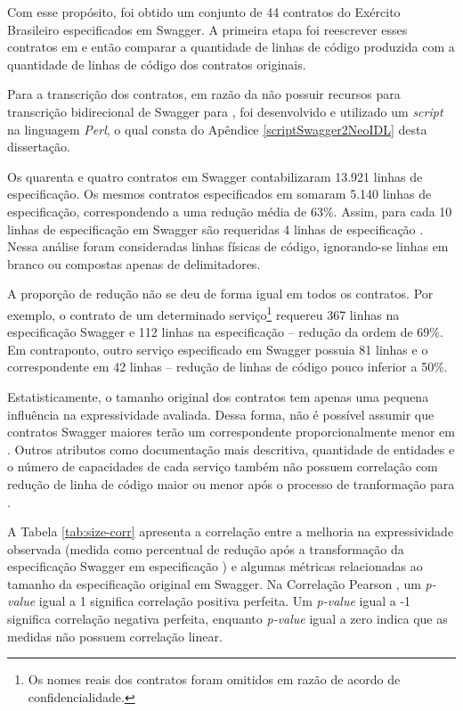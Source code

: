 Com esse propósito, foi obtido um conjunto de 44 contratos do Exército
Brasileiro especificados em Swagger. A primeira etapa foi reescrever esses
contratos em \neoidl{} e então comparar a quantidade de linhas de código
produzida com a quantidade de linhas de código dos contratos originais.

Para a
transcrição dos contratos, em razão da \neoidl{} não possuir recursos para
trans\-crição bidirecional de Swagger para \neoidl{}, foi desenvolvido
e utilizado um \textit{script} na linguagem \textit{Perl}, 
o qual consta do Apêndice \ref{scriptSwagger2NeoIDL} desta dissertação.

Os quarenta e quatro contratos em Swagger contabilizaram 13.921 linhas de
especificação. Os mesmos contratos especificados em \neoidl{} somaram 5.140
linhas de especificação, correspondendo a uma redução média de 63\%. Assim, para
cada 10 linhas de especificação em Swagger são requeridas 4 linhas de
especificação \neoidl{}. Nessa análise foram consideradas linhas físicas de
código, ignorando-se linhas em branco ou compostas apenas de delimitadores.

A proporção de redução não se deu de forma igual em todos os contratos. Por
exemplo, o contrato de um determinado serviço\footnote{Os nomes reais dos
contratos foram omitidos em razão de acordo de confidencialidade.} requereu 367
linhas na especificação Swagger e 112 linhas na especificação \neoidl{} --
redução da ordem de 69\%.
Em contraponto, outro serviço especificado em Swagger possuia 81 linhas e o
correspondente em \neoidl{} 42 linhas -- redução de linhas de código pouco inferior a 50\%.

Estatisticamente, o tamanho original dos contratos tem apenas uma pequena
influência na expressividade avaliada. Dessa forma, não é possível assumir que
contratos Swagger maiores terão um correspondente proporcionalmente menor em
\neoidl{}.
Outros atributos como documentação mais descritiva, quantidade de entidades e o
número de capacidades de cada serviço também não possuem correlação com redução
de linha de código maior ou menor após o processo de tranformação para
\neoidl{}.

A Tabela \ref{tab:size-corr} apresenta a correlação entre a
melhoria na expressividade observada (medida como percentual de redução após a
transformação da especificação Swagger em especificação \neoidl{}) e algumas
métricas relacionadas ao tamanho da especificação original em Swagger. Na
Correlação Pearson \cite{benesty2009pearson}, um \emph{p-value} igual a 1 significa correlação
positiva perfeita. Um \emph{p-value} igual a -1 significa correlação negativa
perfeita, enquanto \emph{p-value} igual a zero indica que as medidas não possuem
correlação linear.

